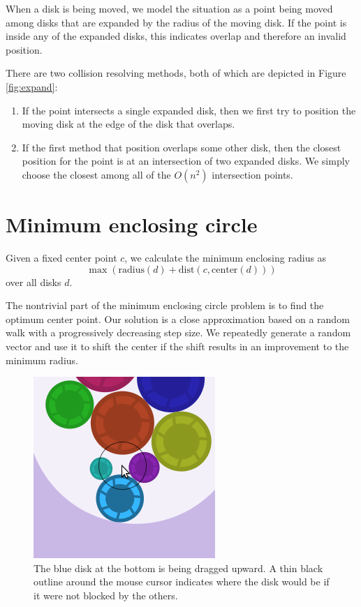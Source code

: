\documentclass{article}
\begin{document}
When a disk is being moved, we model the situation as a point
being moved among disks that are expanded by the radius of the
moving disk.
If the point is inside any of the expanded disks, this indicates
overlap and therefore an invalid position.

There are two collision resolving methods, both of which
are depicted in Figure \ref{fig:expand}:

\begin{enumerate}
\item If the point intersects a single expanded disk, then we first
try to position the moving disk at the edge of the disk that
overlaps.
\item If the first method that position overlaps some other disk, then the closest
position for the point is at an intersection of two expanded disks.
We simply choose the closest among all of the $O(n^2)$ intersection points.
\end{enumerate}

\section{Minimum enclosing circle}

Given a fixed center point $c$, we calculate the
minimum enclosing radius as \[
\max ( \textrm{radius}(d) + \textrm{dist}(c, \textrm{center}(d)) )
\] over all disks $d$.

The nontrivial part of the minimum enclosing circle problem
is to find the optimum center point.
Our solution is a close approximation based on a random walk
with a progressively decreasing step size.
We repeatedly generate a random vector
and use it to shift the center if the shift results in
an improvement to the minimum radius.

\begin{figure}
\centering
\includegraphics[scale=0.4]{drag}
\caption{The blue disk at the bottom is being dragged upward.
  A thin black outline around the mouse cursor indicates where
  the disk would be if it were not blocked by the others.}
\label{fig:drag}
\end{figure}
\end{document}
